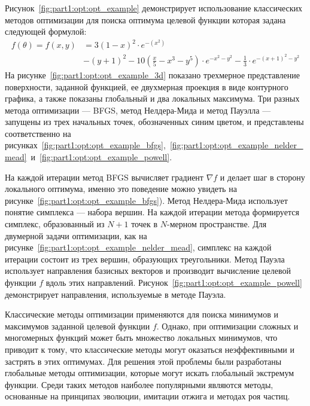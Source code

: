 Рисунок~\ref{fig:part1:opt:opt_example} демонстрирует использование классических методов оптимизации для поиска оптимума целевой функции которая задана следующей формулой:
\begin{align*}
    f(\theta) = f(x, y) & = 3(1-x)^2 \cdot e^{-(x^2)} \\
    & - (y+1)^2 - 10\left(\frac{x}{5} - x^3 - y^5\right) \cdot e^{-x^2-y^2} - \frac{1}{3}\cdot e^{-(x+1)^2 - y^2}
\end{align*}
На рисунке~\ref{fig:part1:opt:opt_example_3d} показано трехмерное представление поверхности, заданной функцией, ее двухмерная проекция в виде контурного графика, а также показаны глобальный и два локальных максимума. 
Три разных метода оптимизации --- BFGS, метод Нелдера-Мида и метод Пауэлла --- запущены из трех начальных точек, обозначенных синим цветом, и представлены соответственно на рисунках~\ref{fig:part1:opt:opt_example_bfgs},~\ref{fig:part1:opt:opt_example_nelder_mead}~и~\ref{fig:part1:opt:opt_example_powell}. 

На каждой итерации метод BFGS вычисляет градиент $\nabla f$ и делает шаг в сторону локального оптимума, именно это поведение можно увидеть на рисунке~\ref{fig:part1:opt:opt_example_bfgs}).
Метод Нелдера-Мида использует понятие симплекса --- набора вершин.
На каждой итерации метода формируется симплекс, образованный из $N+1$ точек в $N$-мерном пространстве.
Для двумерной задачи оптимизации, как на рисунке~\ref{fig:part1:opt:opt_example_nelder_mead}, симплекс на каждой итерации состоит из трех вершин, образующих треугольники.
Метод Пауэла использует направления базисных векторов и производит вычисление целевой функции $f$ вдоль этих направлений.
Рисунок~\ref{fig:part1:opt:opt_example_powell} демонстрирует направления, используемые в методе Пауэла.



Классические методы оптимизации применяются для поиска минимумов и максимумов заданной целевой функции $f$.
Однако, при оптимизации сложных и многомерных функций может быть множество локальных минимумов, что приводит к тому, что классические методы могут оказаться неэффективными и застрять в этих оптимумах.
Для решения этой проблемы были разработаны глобальные методы оптимизации, которые могут искать глобальный экстремум функции.
Среди таких методов наиболее популярными являются методы, основанные на принципах эволюции, имитации отжига и методах роя частиц.


